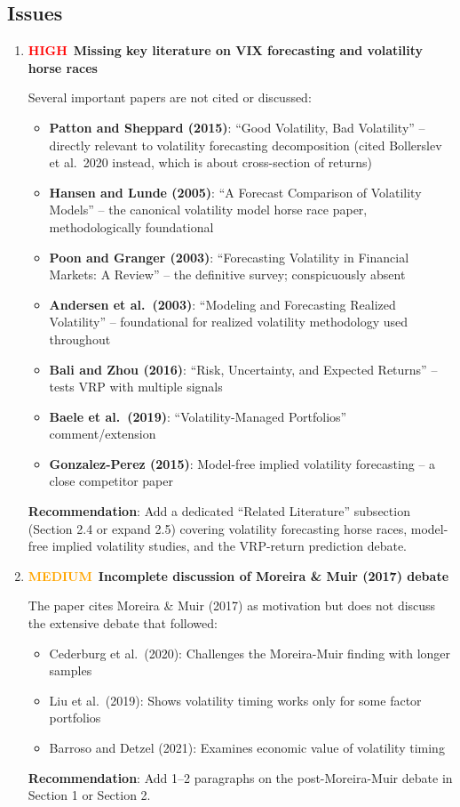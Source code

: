 \documentclass[12pt,a4paper]{article}
\newcommand{\HIGH}{\textcolor{red}{\textbf{HIGH}}}
\newcommand{\MEDIUM}{\textcolor{orange}{\textbf{MEDIUM}}}
\begin{document}
\subsection*{Issues}

\begin{enumerate}[label=D2.\arabic*]

\item \HIGH\ \textbf{Missing key literature on VIX forecasting and volatility horse races}

Several important papers are not cited or discussed:
\begin{itemize}
    \item \textbf{Patton and Sheppard (2015)}: ``Good Volatility, Bad Volatility'' -- directly relevant to volatility forecasting decomposition (cited Bollerslev et al.\ 2020 instead, which is about cross-section of returns)
    \item \textbf{Hansen and Lunde (2005)}: ``A Forecast Comparison of Volatility Models'' -- the canonical volatility model horse race paper, methodologically foundational
    \item \textbf{Poon and Granger (2003)}: ``Forecasting Volatility in Financial Markets: A Review'' -- the definitive survey; conspicuously absent
    \item \textbf{Andersen et al.\ (2003)}: ``Modeling and Forecasting Realized Volatility'' -- foundational for realized volatility methodology used throughout
    \item \textbf{Bali and Zhou (2016)}: ``Risk, Uncertainty, and Expected Returns'' -- tests VRP with multiple signals
    \item \textbf{Baele et al.\ (2019)}: ``Volatility-Managed Portfolios'' comment/extension
    \item \textbf{Gonzalez-Perez (2015)}: Model-free implied volatility forecasting -- a close competitor paper
\end{itemize}
\textbf{Recommendation}: Add a dedicated ``Related Literature'' subsection (Section 2.4 or expand 2.5) covering volatility forecasting horse races, model-free implied volatility studies, and the VRP-return prediction debate.

\item \MEDIUM\ \textbf{Incomplete discussion of Moreira \& Muir (2017) debate}

The paper cites Moreira \& Muir (2017) as motivation but does not discuss the extensive debate that followed:
\begin{itemize}
    \item Cederburg et al.\ (2020): Challenges the Moreira-Muir finding with longer samples
    \item Liu et al.\ (2019): Shows volatility timing works only for some factor portfolios
    \item Barroso and Detzel (2021): Examines economic value of volatility timing
\end{itemize}
\textbf{Recommendation}: Add 1--2 paragraphs on the post-Moreira-Muir debate in Section 1 or Section 2.

\end{enumerate}
\end{document}
